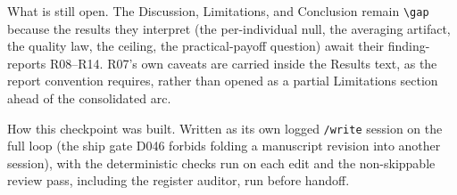 What is still open.
The Discussion, Limitations, and Conclusion remain \verb|\gap| because the results they interpret (the per-individual null, the averaging artifact, the quality law, the ceiling, the practical-payoff question) await their finding-reports R08--R14.
R07's own caveats are carried inside the Results text, as the report convention requires, rather than opened as a partial Limitations section ahead of the consolidated arc.

How this checkpoint was built.
Written as its own logged \texttt{/write} session on the full loop (the ship gate D046 forbids folding a manuscript revision into another session), with the deterministic checks run on each edit and the non-skippable review pass, including the register auditor, run before handoff.
